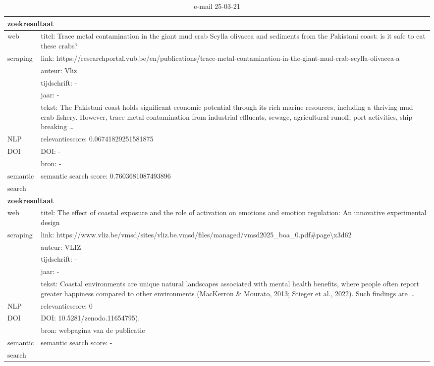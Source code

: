 \begin{table}[h!]
    \caption{e-mail 25-03-21}
    \centering
    \begin{tabularx}{\textwidth}{|p{4cm}|X|} 
        \hline
        \multicolumn{2}{|X|}{\textbf{zoekresultaat}} \\
        \hline
        web &titel: Trace metal contamination in the giant mud crab Scylla olivacea and sediments from the Pakistani coast: is it safe to eat these crabs?\\
        scraping&link: https://researchportal.vub.be/en/publications/trace-metal-contamination-in-the-giant-mud-crab-scylla-olivacea-a\\
        &auteur: Vliz\\
        &tijdschrift: -\\
        &jaar: -\\
        &tekst: The Pakistani coast holds significant economic potential through its rich marine resources, including a thriving mud crab fishery. However, trace metal contamination from industrial effluents, sewage, agricultural runoff, port activities, ship breaking …\\
        \hline
        NLP&relevantiescore: 0.06741829251581875\\
        \hline
        DOI&DOI: -\\
        &bron: -\\
        \hline
        semantic&semantic search score: 0.7603681087493896\\
        search&\\
        \hline
        \multicolumn{2}{|X|}{\textbf{zoekresultaat}} \\
        \hline
        web &titel: The effect of coastal exposure and the role of activation on emotions and emotion regulation: An innovative experimental design\\
        scraping&link: https://www.vliz.be/vmsd/sites/vliz.be.vmsd/files/managed/vmsd2025\_boa\_0.pdf#page\textbackslash x3d62\\
         &auteur: VLIZ\\
        &tijdschrift: -\\
        &jaar: -\\
        &tekst: Coastal environments are unique natural landscapes associated with mental health benefits, where people often report greater happiness compared to other environments (MacKerron \& Mourato, 2013; Stieger et al., 2022). Such findings are …\\
        \hline
        NLP&relevantiescore: 0\\
        \hline
        DOI&DOI: 10.5281/zenodo.11654795).\\
        &bron: webpagina van de publicatie\\
        \hline
        semantic&semantic search score: -\\
        search&\\
        \hline
    \end{tabularx}
    \label{table:email20250321}
\end{table}
